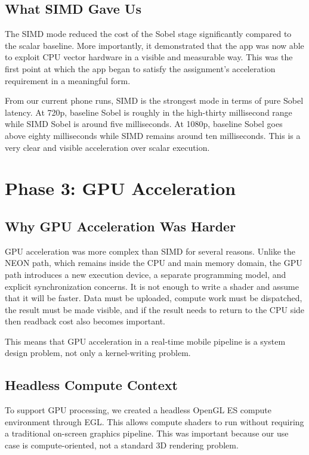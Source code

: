 \documentclass[12pt,a4paper]{article}
\begin{document}
\subsection{What SIMD Gave Us}

The SIMD mode reduced the cost of the Sobel stage significantly compared to the scalar baseline. More importantly, it demonstrated that the app was now able to exploit CPU vector hardware in a visible and measurable way. This was the first point at which the app began to satisfy the assignment's acceleration requirement in a meaningful form.

From our current phone runs, SIMD is the strongest mode in terms of pure Sobel latency. At 720p, baseline Sobel is roughly in the high-thirty millisecond range while SIMD Sobel is around five milliseconds. At 1080p, baseline Sobel goes above eighty milliseconds while SIMD remains around ten milliseconds. This is a very clear and visible acceleration over scalar execution.

\section{Phase 3: GPU Acceleration}

\subsection{Why GPU Acceleration Was Harder}

GPU acceleration was more complex than SIMD for several reasons. Unlike the NEON path, which remains inside the CPU and main memory domain, the GPU path introduces a new execution device, a separate programming model, and explicit synchronization concerns. It is not enough to write a shader and assume that it will be faster. Data must be uploaded, compute work must be dispatched, the result must be made visible, and if the result needs to return to the CPU side then readback cost also becomes important.

This means that GPU acceleration in a real-time mobile pipeline is a system design problem, not only a kernel-writing problem.

\subsection{Headless Compute Context}

To support GPU processing, we created a headless OpenGL ES compute environment through EGL. This allows compute shaders to run without requiring a traditional on-screen graphics pipeline. This was important because our use case is compute-oriented, not a standard 3D rendering problem.
\end{document}
